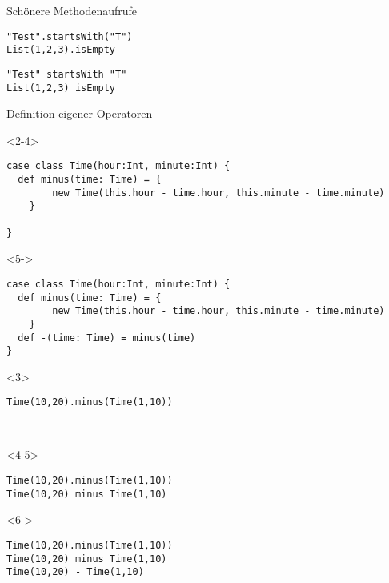\documentclass[14pt,aspectratio=169,trans]{beamer} %
\begin{document}
\begin{frame}[fragile]{}
 \begin{block}{Schönere Methodenaufrufe}
\scriptsize
	\onslide<2->
  \begin{lstlisting}
"Test".startsWith("T")
List(1,2,3).isEmpty
	\end{lstlisting}
  \begin{lstlisting}
"Test" startsWith "T"
List(1,2,3) isEmpty
	\end{lstlisting}
\end{block}
\note{}
\end{frame}


\begin{frame}[fragile]{}
 \begin{block}{Definition eigener Operatoren}
\scriptsize
\begin{overlayarea}{\textwidth}{4cm}
	\begin{onlyenv}<2-4>
  \begin{lstlisting}
case class Time(hour:Int, minute:Int) {
  def minus(time: Time) = {
		new Time(this.hour - time.hour, this.minute - time.minute)
	}
	
}
	\end{lstlisting}
	\end{onlyenv}
	\begin{onlyenv}<5->
	\begin{lstlisting}
case class Time(hour:Int, minute:Int) {
  def minus(time: Time) = {
		new Time(this.hour - time.hour, this.minute - time.minute)
	}
  def -(time: Time) = minus(time)
}
	\end{lstlisting}
	\end{onlyenv}
	\begin{onlyenv}
  \begin{lstlisting}[firstnumber=7]
Time(10,20).minus(Time(1,10))

			
	\end{lstlisting}
	\end{onlyenv}
	\begin{onlyenv}<4-5>
  \begin{lstlisting}[firstnumber=7]
Time(10,20).minus(Time(1,10))
Time(10,20) minus Time(1,10)

	\end{lstlisting}
	\end{onlyenv}
	\begin{onlyenv}<6->
  \begin{lstlisting}[firstnumber=7]
Time(10,20).minus(Time(1,10))
Time(10,20) minus Time(1,10)
Time(10,20) - Time(1,10)
	\end{lstlisting}
	\end{onlyenv}
	\end{overlayarea}
\end{block}
\note{}
\end{frame}
\end{document}
